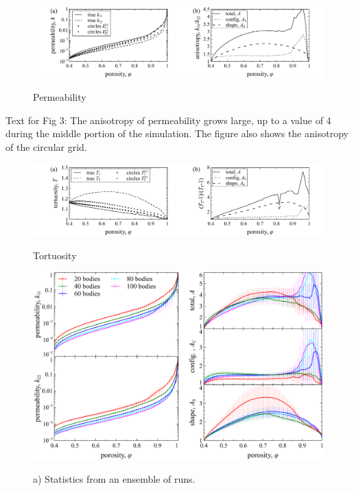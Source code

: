 \documentclass[3p]{elsarticle}
\begin{document}
\begin{figure}%
\centering \label{fig3}
\includegraphics[width = 0.99 \textwidth]{./figs/fig3.pdf}
\caption{
Permeability
}
\end{figure}


Text for Fig 3: 
The anisotropy of permeability grows large, up to a value of 4 during the middle portion of the simulation. The figure also shows the anisotropy of the circular grid.

\begin{figure}%
\centering \label{fig4}
\includegraphics[width = 0.99 \textwidth]{./figs/fig4.pdf}
\caption{
Tortuosity
}
\end{figure}

\begin{figure}%
\centering \label{fig5}
\includegraphics[width = 0.99 \textwidth]{./figs/fig5.pdf}
\caption{
a) Statistics from an ensemble of runs.
}
\end{figure}
\end{document}
